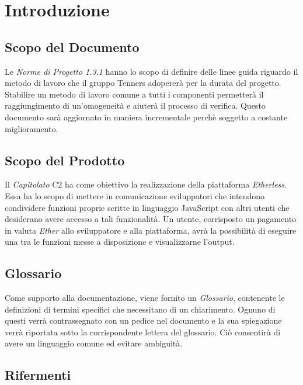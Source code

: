 \section{Introduzione}

\subsection{Scopo del Documento}
Le \textit{Norme di Progetto 1.3.1\doc} hanno lo scopo di definire delle linee guida riguardo il metodo di lavoro che il gruppo Tenners adopererà per la durata del progetto. Stabilire un metodo di lavoro comune a tutti i componenti permetterà il raggiungimento di un'omogeneità e aiuterà il processo di verifica. Questo documento sar\`a aggiornato in maniera incrementale perchè soggetto a costante miglioramento.

\subsection{Scopo del Prodotto}
Il \textit{Capitolato\glo} C2 ha come obiettivo la realizzazione della piattaforma \textit{Etherless}. Essa ha lo scopo di mettere in comunicazione sviluppatori che intendono condividere funzioni proprie scritte in linguaggio JavaScript con altri utenti che desiderano avere accesso a tali funzionalità. Un utente, corrisposto un pagamento in valuta \textit{Ether\glos} allo sviluppatore e alla piattaforma, avrà la possibilità di eseguire una tra le funzioni messe a disposizione e visualizzarne l'output.


\subsection{Glossario}
Come supporto alla documentazione, viene fornito un \textit{Glossario}\docs,
contenente le definizioni di termini specifici che necessitano di un chiarimento.
Ognuno di questi verr\`a contrassegnato con un pedice \glo nel documento e la sua
spiegazione verr\`a riportata sotto la corrispondente lettera del glossario. Ci\`o
consentir\`a di avere un linguaggio comune ed evitare ambiguit\`a.

\subsection{Rifermenti}
